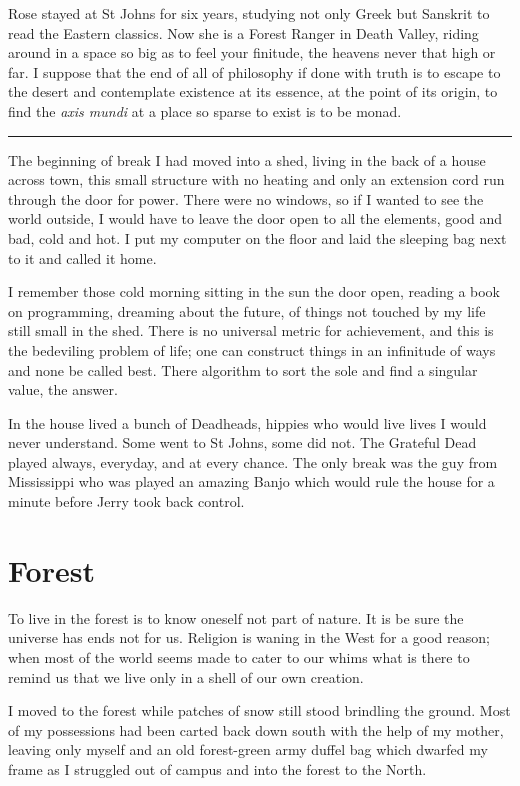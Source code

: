 \documentclass[ebook, 10pt, openright, onecolumn]{memoir}
\newcommand*\starbreak{\fancybreak*{\Large{* * *}}}
\begin{document}
Rose stayed at St Johns for six years, studying not only Greek but Sanskrit to
read the Eastern classics.  Now she is a Forest Ranger in Death Valley, riding
around in a space so big as to feel your finitude, the heavens never that high
or far.  I suppose that the end of all of philosophy if done with truth is to
escape to the desert and contemplate existence at its essence, at the point of
its origin, to find the \textit{axis mundi} at a place so sparse to exist is to
be monad. 

\starbreak

The beginning of break I had moved into a shed, living in the back of a house
across town, this small structure with no heating and only an extension cord run
through the door for power.  There were no windows, so if I wanted to see the
world outside, I would have to leave the door open to all the elements, good and
bad, cold and hot.  I put my computer on the floor and laid the sleeping bag
next to it and called it home.

I remember those cold morning sitting in the sun the door open, reading a book
on programming, dreaming about the future, of things not touched by my life
still small in the shed.  There is no universal metric for achievement, and this
is the bedeviling problem of life; one can construct things in an infinitude of
ways and none be called best.  There algorithm to sort the sole and find a
singular value, the answer.  

In the house lived a bunch of Deadheads, hippies who would live lives I would
never understand.  Some went to St Johns, some did not.  The Grateful Dead
played always, everyday, and at every chance.  The only break was the guy from
Mississippi who was played an amazing Banjo which would rule the house for a
minute before Jerry took back control.

\chapter{Forest}
\label{cha:forest}

To live in the forest is to know oneself not part of nature.  It is be sure the
universe has ends not for us.  Religion is waning in the West for a good
reason; when most of the world seems made to cater to our whims what is there to
remind us that we live only in a shell of our own creation.

I moved to the forest while patches of snow still stood brindling the
ground. Most of my possessions had been carted back down south with the help of
my mother, leaving only myself and an old forest-green army duffel bag which
dwarfed my frame as I struggled out of campus and into the forest to the North.
\end{document}
